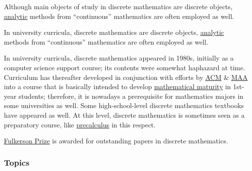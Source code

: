 \documentclass{article}
\begin{document}
Although main objects of study in discrete mathematics are discrete objects, \href{https://en.wikipedia.org/wiki/Analysis_(mathematics)}{analytic} methods from ``continuous'' mathematics are often employed as well.

In university curricula, discrete mathematics are discrete objects, \href{https://en.wikipedia.org/wiki/Analysis_(mathematics)}{analytic} methods from ``continuous'' mathematics are often employed as well.

In university curricula, discrete mathematics appeared in 1980s, initially as a computer science support course; its contents were somewhat haphazard at time. Curriculum has thereafter developed in conjunction with efforts by \href{https://en.wikipedia.org/wiki/Association_for_Computing_Machinery}{ACM} \& \href{https://en.wikipedia.org/wiki/Mathematical_Association_of_America}{MAA} into a course that is basically intended to develop \href{https://en.wikipedia.org/wiki/Mathematical_maturity}{mathematical maturity} in 1st-year students; therefore, it is nowadays a prerequisite for mathematics majors in some universities as well. Some high-school-level discrete mathematics textbooks have appeared as well. At this level, discrete mathematics is sometimes seen as a preparatory course, like \href{https://en.wikipedia.org/wiki/Precalculus}{precalculus} in this respect.

\href{https://en.wikipedia.org/wiki/Fulkerson_Prize}{Fulkerson Prize} is awarded for outstanding papers in discrete mathematics.

\subsubsection{Topics}
\end{document}

